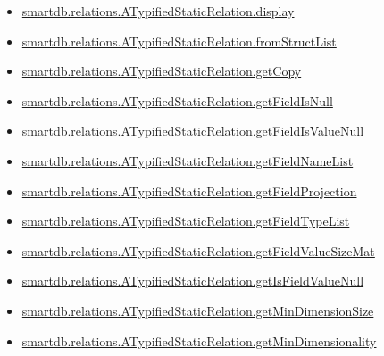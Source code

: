 \documentclass[letterpaper,10pt,english]{sphinxmanual}
\begin{document}
\begin{itemize}
\item {} 
{\hyperref[chap_func:smartdb-relations-atypifiedstaticrelation-display]{smartdb.relations.ATypifiedStaticRelation.display}}

\item {} 
{\hyperref[chap_func:smartdb-relations-atypifiedstaticrelation-fromstructlist]{smartdb.relations.ATypifiedStaticRelation.fromStructList}}

\item {} 
{\hyperref[chap_func:smartdb-relations-atypifiedstaticrelation-getcopy]{smartdb.relations.ATypifiedStaticRelation.getCopy}}

\item {} 
{\hyperref[chap_func:smartdb-relations-atypifiedstaticrelation-getfieldisnull]{smartdb.relations.ATypifiedStaticRelation.getFieldIsNull}}

\item {} 
{\hyperref[chap_func:smartdb-relations-atypifiedstaticrelation-getfieldisvaluenull]{smartdb.relations.ATypifiedStaticRelation.getFieldIsValueNull}}

\item {} 
{\hyperref[chap_func:smartdb-relations-atypifiedstaticrelation-getfieldnamelist]{smartdb.relations.ATypifiedStaticRelation.getFieldNameList}}

\item {} 
{\hyperref[chap_func:smartdb-relations-atypifiedstaticrelation-getfieldprojection]{smartdb.relations.ATypifiedStaticRelation.getFieldProjection}}

\item {} 
{\hyperref[chap_func:smartdb-relations-atypifiedstaticrelation-getfieldtypelist]{smartdb.relations.ATypifiedStaticRelation.getFieldTypeList}}

\item {} 
{\hyperref[chap_func:smartdb-relations-atypifiedstaticrelation-getfieldvaluesizemat]{smartdb.relations.ATypifiedStaticRelation.getFieldValueSizeMat}}

\item {} 
{\hyperref[chap_func:smartdb-relations-atypifiedstaticrelation-getisfieldvaluenull]{smartdb.relations.ATypifiedStaticRelation.getIsFieldValueNull}}

\item {} 
{\hyperref[chap_func:smartdb-relations-atypifiedstaticrelation-getmindimensionsize]{smartdb.relations.ATypifiedStaticRelation.getMinDimensionSize}}

\item {} 
{\hyperref[chap_func:smartdb-relations-atypifiedstaticrelation-getmindimensionality]{smartdb.relations.ATypifiedStaticRelation.getMinDimensionality}}


\end{itemize}
\end{document}
